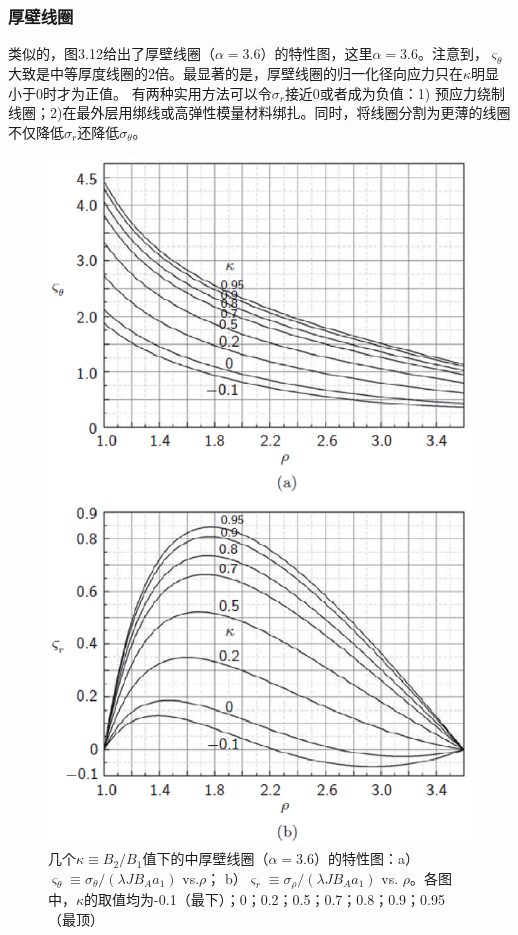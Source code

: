 \subsubsection{厚壁线圈}
类似的，图3.12给出了厚壁线圈（$\alpha=3.6$）的特性图，这里$\alpha=3.6$。注意到，$\varsigma_\theta$大致是中等厚度线圈的2倍。最显著的是，厚壁线圈的归一化径向应力只在$\kappa$明显小于0时才为正值。
有两种实用方法可以令$\sigma_{r}$接近0或者成为负值：1) 预应力绕制线圈；2)在最外层用绑线或高弹性模量材料绑扎。同时，将线圈分割为更薄的线圈不仅降低$\sigma_{r}$还降低$\sigma_{\theta}$。
\begin{figure}
  \centering
 \includegraphics[scale=0.7]{chpt3/figs/fig3.12.eps}
  \caption{几个$\kappa\equiv B_2/B_1$值下的中厚壁线圈（$\alpha=3.6$）的特性图：a）$\varsigma_\theta\equiv \sigma_\theta/(\lambda J B_A a_1)$ vs.$\rho$；
  b）$\varsigma_r \equiv \sigma_\rho/(\lambda J B_A a_1)$ vs. $\rho$。各图中，$\kappa$的取值均为-0.1（最下）；0；0.2；0.5；0.7；0.8；0.9；0.95（最顶） }
\end{figure}


